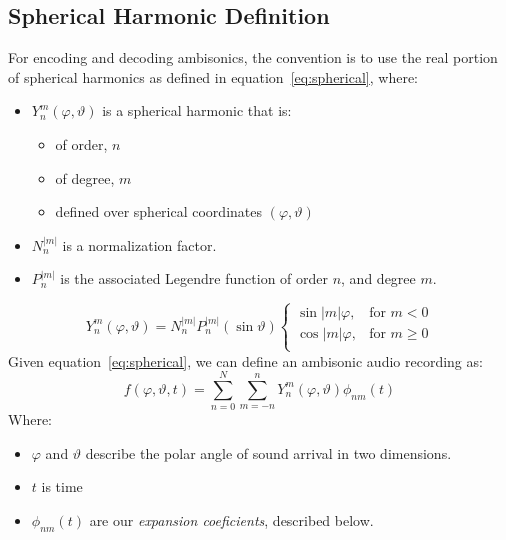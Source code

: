 \subsection{Spherical Harmonic Definition}
For encoding and decoding ambisonics, the convention is to use the
real portion of spherical harmonics as defined in
equation~\ref{eq:spherical}, where:
\begin{itemize}
\item $Y_{n}^{m}(\varphi,\vartheta)$ is a spherical harmonic that
is:
\begin{itemize}
\item of order, $n$
\item of degree, $m$
\item defined over spherical coordinates $(\varphi, \vartheta)$
\end{itemize}
\item $N_n^{|m|}$ is a normalization factor.\cite{Nachbar2011}
\item $P_n^{|m|}$ is the associated Legendre function of order $n$,
  and degree $m$.
\end{itemize}
\begin{equation}
Y_{n}^{m}(\varphi,\vartheta)=N_n^{|m|}P_n^{|m|}(\sin{\vartheta})
\begin{cases}\label{eq:spherical}
\sin{|m|\varphi},&  \text{for $m<0$}\\  
\cos{|m|\varphi},& \text{for $m\geq 0$}\\
\end{cases}
\end{equation}
Given equation~\ref{eq:spherical}, we can define an ambisonic
audio recording as:
\begin{equation}
f(\varphi,\vartheta,t)=\sum\limits_{n=0}^N\sum\limits_{m=-n}^nY_n^m(\varphi,\vartheta)\phi_{nm}(t)
\label{eq:ambisonics}
\end{equation}
Where:
\begin{itemize}
\item $\varphi$ and $\vartheta$ describe the polar angle of sound
  arrival in two dimensions.
\item $t$ is time
\item $\phi_{nm}(t)$ are our \textit{expansion coeficients}, described
  below.
\end{itemize}
